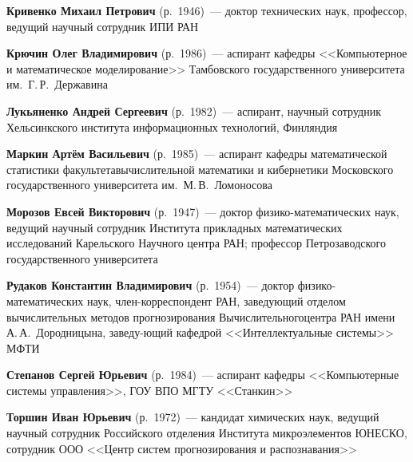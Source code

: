 \begin{multicols}{2}
\vspace*{3pt}

\noindent
\textbf{Кривенко Михаил Петрович} (р.\ 1946)~--- доктор технических наук, профессор, ведущий научный сотрудник ИПИ РАН

\noindent
\textbf{Крючин Олег Владимирович} (р.\ 1986)~--- аспирант кафедры <<Компьютерное и математическое моделирование>>
Тамбовского государственного университета им.\ Г.\,Р.~Державина

\vspace*{3pt}


\noindent
\textbf{Лукьяненко Андрей Сергеевич} (р.\ 1982)~--- аспирант, научный сотрудник  
Хельсинкского института информационных технологий, Финляндия

\columnbreak


\noindent
\textbf{Маркин Артём Васильевич} (р.\ 1985)~---  аспирант кафедры математической 
статистики факультета\linebreak вычис\-лительной математики и кибернетики 
Московского государственного университета им.\ М.\,В.~Ломоносова

\vspace*{3pt}

\noindent
\textbf{Морозов Евсей Викторович} (р.\  1947)~--- 
доктор физико-математических наук, ведущий научный сотрудник   
Института прикладных математических исследований Карельского Научного центра РАН;  
профессор Петрозаводского государственного университета


\vspace*{3pt}

\noindent
\textbf{Рудаков Константин Владимирович} (р.\ 1954)~--- доктор физико-математических наук, 
член-коррес\-пон\-дент РАН, заведующий 
отделом вычислительных методов прогнозирования Вычислительного\linebreak центра РАН 
имени А.\,А.~Дородницына, за\-ве\-ду-\linebreak ющий кафедрой <<Интеллектуальные системы>> \mbox{МФТИ}

\vspace*{3pt}

\noindent
\textbf{Степанов Сергей Юрьевич} (р.\ 1984)~---
аспирант кафедры <<Компьютерные системы управления>>, ГОУ ВПО МГТУ <<Станкин>>

\vspace*{3pt}
 
\noindent
\textbf{Торшин Иван Юрьевич} (р.\ 1972)~--- кандидат химических наук, ведущий научный сотрудник 
Российского отделения Института микроэлементов \mbox{ЮНЕСКО}, сотрудник ООО <<Центр систем прогнозирования и распознавания>>



\end{multicols}
